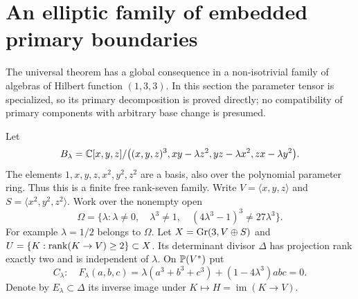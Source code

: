 \section{An elliptic family of embedded primary boundaries}
\label{sec:elliptic-boundary}
The universal theorem has a global consequence in a non-isotrivial
family of algebras of Hilbert function $(1,3,3)$. In this section the
parameter tensor is specialized, so its primary decomposition is
proved directly; no compatibility of primary components with arbitrary
base change is presumed.

Let
\begin{equation}\label{eq:elliptic-algebra}
 B_\lambda=\mathbb C[x,y,z]/\bigl((x,y,z)^3,
        xy-\lambda z^2,yz-\lambda x^2,zx-\lambda y^2\bigr).
\end{equation}
The elements $1,x,y,z,x^2,y^2,z^2$ are a basis, also over the
polynomial parameter ring. Thus this is a finite free rank-seven
family. Write $V=\langle x,y,z\rangle$ and
$S=\langle x^2,y^2,z^2\rangle$. Work over the nonempty open
\begin{equation}\label{eq:elliptic-parameter-open}
 \Omega=\{\lambda:\lambda\ne0,\quad\lambda^3\ne1,\quad
                  (4\lambda^3-1)^3\ne27\lambda^3\}.
\end{equation}
For example $\lambda=1/2$ belongs to $\Omega$.
Let $X=\operatorname{Gr}(3,V\oplus S)$ and
$U=\{K:\operatorname{rank}(K\to V)\ge2\}\subset X$.
Its determinant divisor $\Delta$ has projection rank exactly two
and is independent of $\lambda$. On $\mathbb P(V^*)$ put
\begin{equation}\label{eq:elliptic-cubic}
 C_\lambda:\quad F_\lambda(a,b,c)
   =\lambda(a^3+b^3+c^3)+(1-4\lambda^3)abc=0.
\end{equation}
Denote by $E_\lambda\subset\Delta$ its inverse image under
$K\mapsto H=\operatorname{im}(K\to V)$.

